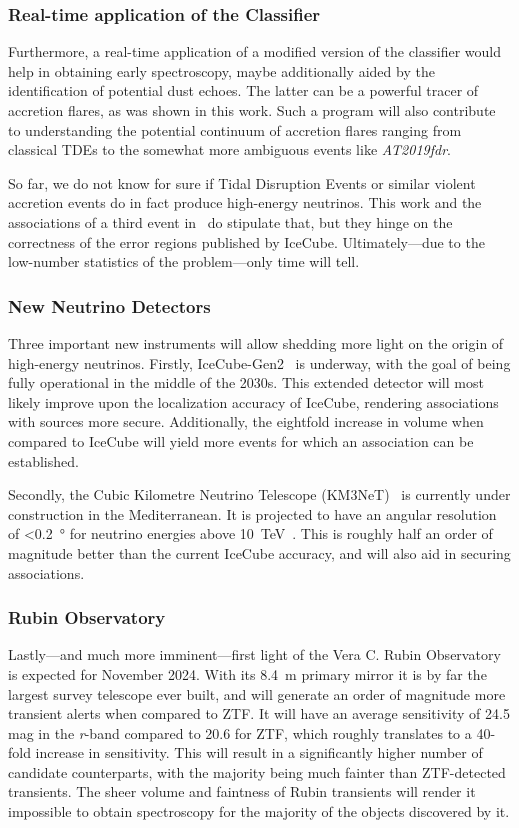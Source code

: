 \subsubsection{Real-time application of the Classifier}
Furthermore, a real-time application of a modified version of the classifier would help in obtaining early spectroscopy, maybe additionally aided by the identification of potential dust echoes. The latter can be a powerful tracer of accretion flares, as was shown in this work. Such a program will also contribute to understanding the potential continuum of accretion flares ranging from classical TDEs to the somewhat more ambiguous events like \textit{AT2019fdr}.

So far, we do not know for sure if Tidal Disruption Events or similar violent accretion events do in fact produce high-energy neutrinos. This work and the associations of a third event in~\cite{Velzen2021} do stipulate that, but they hinge on the correctness of the error regions published by IceCube. Ultimately---due to the low-number statistics of the problem---only time will tell.

\subsubsection{New Neutrino Detectors}
Three important new instruments will allow shedding more light on the origin of high-energy neutrinos. Firstly, IceCube-Gen2~ is underway, with the goal of being fully operational in the middle of the 2030s. This extended detector will most likely improve upon the localization accuracy of IceCube, rendering associations with sources more secure. Additionally, the eightfold increase in volume when compared to IceCube will yield more events for which an association can be established.

Secondly, the Cubic Kilometre Neutrino Telescope (KM3NeT)~ is currently under construction in the Mediterranean. It is projected to have an angular resolution of \SI{<0.2}{\degree} for neutrino energies above \SI{10}{\tera\eV}~. This is roughly half an order of magnitude better than the current IceCube accuracy, and will also aid in securing associations.

\subsubsection{Rubin Observatory}
Lastly---and much more imminent---first light of the Vera C. Rubin Observatory~\cite{Ivezic2019} is expected for November 2024. With its \SI{8.4}{\m} primary mirror it is by far the largest survey telescope ever built, and will generate an order of magnitude more transient alerts when compared to ZTF. It will have an average sensitivity of 24.5 mag in the \textit{r}-band compared to 20.6 for ZTF, which roughly translates to a 40-fold increase in sensitivity. This will result in a significantly higher number of candidate counterparts, with the majority being much fainter than ZTF-detected transients. The sheer volume and faintness of Rubin transients will render it impossible to obtain spectroscopy for the majority of the objects discovered by it.

